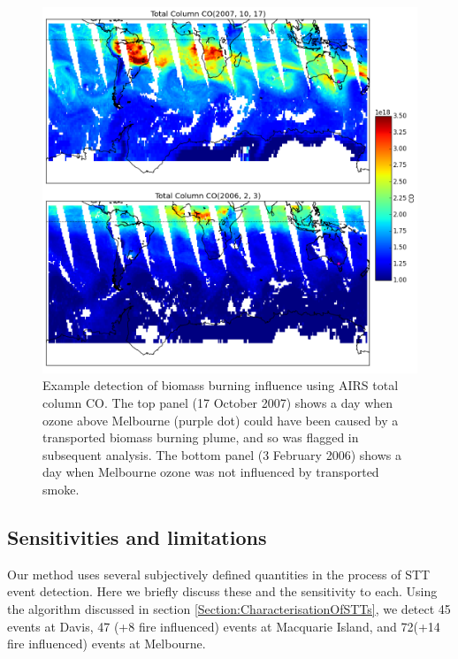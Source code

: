 \documentclass{article}
\begin{document}
    \begin{figure}[!htbp]
      \includegraphics[width=\textwidth]{figures/AIRS_compare.png}
      \caption{ Example detection of biomass burning influence using AIRS total column CO. 
	The top panel (17 October 2007) shows a day when ozone above Melbourne (purple dot) could have been caused by a transported biomass burning plume, and so was flagged in subsequent analysis.
	The bottom panel (3 February 2006) shows a day when Melbourne ozone was not influenced by transported smoke.}
      \label{fig:excludedeg}
    \end{figure}
    
  \subsection{Sensitivities and limitations}
    Our method uses several subjectively defined quantities in the process of STT event detection.
    Here we briefly discuss these and the sensitivity to each.
    Using the algorithm discussed in section \ref{Section:CharacterisationOfSTTs}, we detect 45 events at Davis, 47 (+8 fire influenced) events at Macquarie Island, and 72(+14 fire influenced) events at Melbourne.
    
\end{document}
